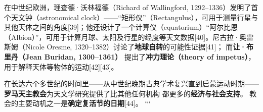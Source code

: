 在中世纪欧洲，理查德·沃林福德（Richard of Wallingford, 1292–1336）发明了首个天文钟（astronomical clock）——“矩形仪”（Rectangulus），可用于测量行星与其他天体之间的角度[39]；他还设计了一个计算仪（equatorium）“阿尔比恩（Albion）”，可用于计算月球、太阳及行星的经度等天文数据[40]。尼古拉·奥雷斯姆（Nicole Oresme, 1320–1382）讨论了\textbf{地球自转}的可能性证据[41]；  
而\textbf{让·布里丹（Jean Buridan, 1300–1361）}  
提出了\textbf{冲力理论（theory of impetus）}，  
用于解释天体等物体的运动[42][43]。  

在长达六个多世纪的时间里——从中世纪晚期古典学术复兴直到启蒙运动时期——  
\textbf{罗马天主教会}为天文学研究提供了比其他任何机构  
都更多的\textbf{经济与社会支持}。  
教会的主要动机之一是\textbf{确定复活节的日期}[44]。
```
